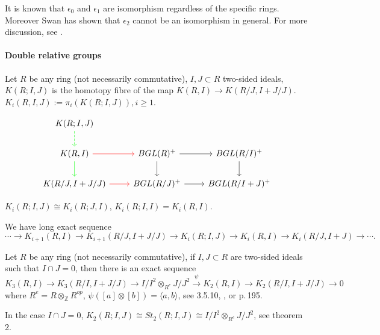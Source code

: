 \begin{remark}
	It is known that $\epsilon_0$ and $\epsilon_1$ are isomorphism regardless of the specific rings. Moreover  Swan \cite{SWAN1971221} has shown  that  $\epsilon_2$  cannot be an isomorphism in general. For more discussion, see \cite{STEIN1980213}.
\end{remark}
\paragraph{Double relative groups} %
\label{par:double_relative_groups}



\begin{definition}
	Let $R$ be any ring (not necessarily commutative), $I,J\subset R$ two-sided ideals, $K(R;I,J)$ is the homotopy fibre of the map $K(R,I)\longrightarrow K(R/J,I+J/J)$. $K_i(R,I,J):=\pi_i(K(R;I,J)), i\geq 1$.
\end{definition}
\[
\begin{tikzcd}
	K(R;I,J) \ar[d, green, dashed] & & \\
	K(R,I) \ar[r,red] \ar[d, green] & BGL(R)^+ \ar[r] \ar[d] &BGL(R/I)^+ \ar[d] \\
	K(R/J,I+J/J) \ar[r,red]  & BGL(R/J)^+ \ar[r]  &BGL(R/I+J)^+ 
\end{tikzcd}\]
\begin{remark}
	$K_i(R;I,J)\cong K_i(R;J,I)$, $K_i(R;I,I)=K_i(R,I)$.
\end{remark}
We have long exact sequence 
\[\cdots \longrightarrow K_{i+1}(R,I)\longrightarrow K_{i+1}(R/J,I+J/J) \longrightarrow K_i(R;I,J)\longrightarrow K_i(R,I)\longrightarrow K_i(R/J,I+J)\longrightarrow \cdots.\]



Let $R$ be any ring (not necessarily commutative), if $I,J\subset R$ are two-sided ideals such that $I\cap J =0$, then there is an exact sequence
\[K_3(R,I) \longrightarrow K_3(R/I,I+J/J)\longrightarrow I/I^2\otimes_{R^e}J/J^2\overset{\psi}{\longrightarrow}K_2(R,I)\longrightarrow K_2(R/I,I+J/J)\longrightarrow 0\]
where $R^e= R\otimes_{\mathbb{Z}}R^{op}$, $\psi([a]\otimes [b])=\langle a, b\rangle$, see \cite{weibel2013k} 3.5.10, \cite{STEIN1980213}, \cite{Keune1978The} or \cite{friedlander1981algebraic} p.\,195.

In the case $I\cap J =0$, $K_2(R;I,J)\cong St_2(R;I,J)\cong I/I^2\otimes_{R^e}J/J^2$, see \cite{Guin-Waléry1981} theorem 2.

